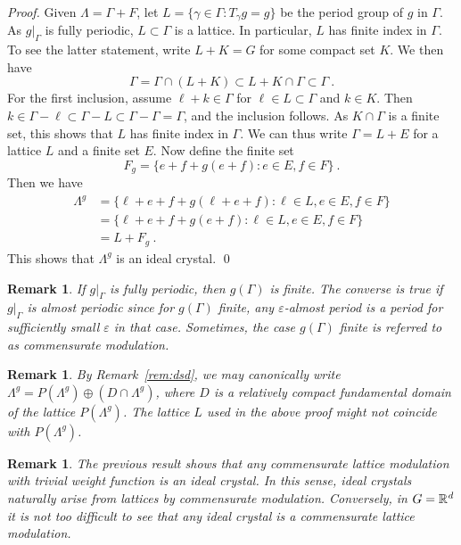 \documentclass[11pt, a4wide]{amsart}
\newcommand{\ts}{\hspace{0.5pt}}
\newcommand{\RR}{\mathbb{R}\ts}
\newtheorem{remark}[lemma]{Remark}
\numberwithin{lemma}{section}
\begin{document}
\begin{proof}
Given $\Lambda=\Gamma+F$, let $L=\{\gamma\in \Gamma: T_\gamma g=g\}$ be the period group of $g$ in $\Gamma$. As $g|_\Gamma$ is fully periodic, $L\subset \Gamma$ is a lattice.  In particular, $L$ has finite index in $\Gamma$. To see the latter statement, write $L+K=G$ for some compact set $K$. We then have
%
\begin{displaymath}
\Gamma=\Gamma\cap (L+K) \subset  L+K\cap \Gamma\subset \Gamma \ .
\end{displaymath}
%
For the first inclusion, assume $\ell+k\in \Gamma$ for $\ell\in L\subset \Gamma$ and $k\in K$. Then  $k\in \Gamma-\ell\subset \Gamma-L\subset \Gamma-\Gamma=\Gamma$, and the inclusion follows.
As $K\cap \Gamma$ is a finite set, this shows that $L$ has finite index in $\Gamma$.
We can thus write $\Gamma=L+E$ for a lattice $L$ and a finite set $E$. Now define the finite set
%
\begin{displaymath}
F_g=\{e+f+ g(e+f): e\in E, f \in F\} \ .
\end{displaymath}
%
Then we have
%
\begin{displaymath}
\begin{split}
\Lambda^g&= \{\ell+e+f+g(\ell+e+f) : \ell\in L, e\in E, f\in F\} \\
&= \{\ell+e+f+g(e+f) : \ell\in L, e\in E, f\in F\} \\
&= L+F_g \ .
\end{split}
\end{displaymath}
%
This shows that $\Lambda^g$ is an ideal crystal.
\qed
\end{proof}

\begin{remark}
If $g|_\Gamma$ is fully periodic, then $g(\Gamma)$ is finite. The converse is true if $g|_\Gamma$ is almost periodic since for $g(\Gamma)$ finite, any $\varepsilon$-almost period is a period for sufficiently small $\varepsilon$ in that case. Sometimes, the case $g(\Gamma)$ finite is referred to as commensurate modulation.
\end{remark}

\begin{remark}
By Remark~\ref{rem:dsd}, we may canonically write $\Lambda^g=P(\Lambda^g)\oplus (D\cap \Lambda^g)$, where $D$ is a relatively compact fundamental domain of the lattice $P(\Lambda^g)$. The lattice $L$ used in the above proof might not coincide with $P(\Lambda^g)$. 
\end{remark}

\begin{remark}\label{rem:comm}
The previous result shows that any commensurate lattice modulation with trivial weight function is an ideal crystal. In this sense, ideal crystals naturally arise from lattices by commensurate modulation.  Conversely, in $G=\RR^d$ it is not too difficult to see that any ideal crystal is a commensurate lattice modulation. 
\end{remark}
\end{document}
